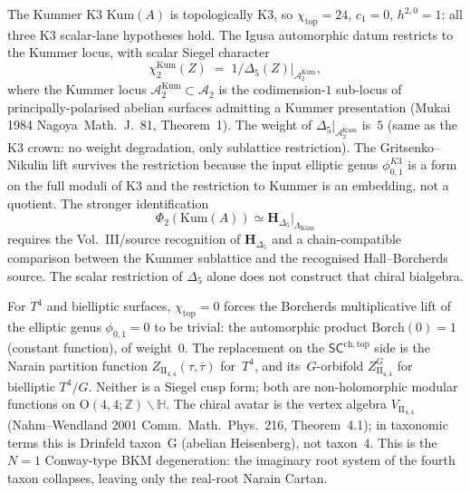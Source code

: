 \begin{remark}[Kummer Siegel weight $= 5$ with Kummer sublattice
restriction]
\label{rem:wac-W17-kummer-weight}
The Kummer K3 $\mathrm{Kum}(A)$ is topologically K3, so
$\chi_{\mathrm{top}} = 24$, $c_1 = 0$, $h^{2,0} = 1$: all three
K3 scalar-lane hypotheses hold. The Igusa automorphic datum restricts
to the Kummer locus, with scalar Siegel character
\[
 \chi^{\mathrm{Kum}}_2(Z)
 \;=\;
 1/\Delta_5(Z)\big|_{\mathcal{A}_2^{\mathrm{Kum}}},
\]
where the Kummer locus $\mathcal{A}_2^{\mathrm{Kum}}\subset\mathcal{A}_2$
is the codimension-$1$ sub-locus of principally-polarised abelian
surfaces admitting a Kummer presentation (Mukai 1984
\textup{Nagoya~Math.~J.}~81, Theorem~1). The weight of
$\Delta_5\big|_{\mathcal{A}_2^{\mathrm{Kum}}}$ is~$5$ (same as the
K3 crown: no weight degradation, only sublattice restriction).
The Gritsenko--Nikulin lift survives the restriction because the
input elliptic genus $\phi_{0,1}^{K3}$ is a form on the full
moduli of K3 and the restriction to Kummer is an embedding,
not a quotient. The stronger identification
\[
 \Phi_2(\mathrm{Kum}(A))
 \simeq
 \mathbf{H}_{\Delta_5}\big|_{\Lambda_{\mathrm{Kum}}}
\]
requires the Vol.~III/source recognition of $\mathbf{H}_{\Delta_5}$ and
a chain-compatible comparison between the Kummer sublattice and the
recognised Hall--Borcherds source. The scalar restriction of
$\Delta_5$ alone does not construct that chiral bialgebra.
\end{remark}

\begin{remark}[$T^4$ and bielliptic: Siegel weight $= 0$,
Narain partition function instead]
\label{rem:wac-W17-T4-weight}
For $T^4$ and bielliptic surfaces, $\chi_{\mathrm{top}} = 0$
forces the Borcherds multiplicative lift of the elliptic genus
$\phi_{0,1} = 0$ to be trivial: the automorphic product
$\mathrm{Borch}(0) = 1$ (constant function), of weight~$0$. The
replacement on the $\mathsf{SC}^{\mathrm{ch,top}}$ side is the
Narain partition function $Z_{\mathrm{II}_{4,4}}(\tau, \bar\tau)$
for~$T^4$, and its~$G$-orbifold $Z_{\mathrm{II}_{4,4}}^G$ for
bielliptic $T^4/G$. Neither is a Siegel cusp form; both are
non-holomorphic modular functions on
$\mathrm{O}(4,4;\mathbb{Z})\backslash\mathbb{H}$. The chiral
avatar is the vertex algebra
$V_{\mathrm{II}_{4,4}}$ (Nahm--Wendland 2001
\textup{Comm.~Math.~Phys.}~216, Theorem~4.1); in taxonomic terms
this is Drinfeld taxon~G (abelian Heisenberg), not taxon~$4$.
This is the $N = 1$ Conway-type BKM degeneration: the imaginary
root system of the fourth taxon collapses, leaving only the
real-root Narain Cartan.
\end{remark}

